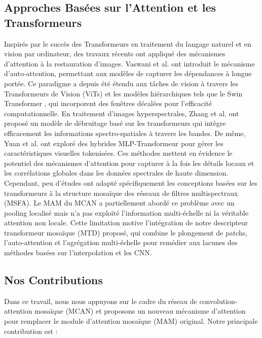 \documentclass[conference]{IEEEtran}
\begin{document}
\subsection{Approches Basées sur l'Attention et les Transformeurs}

Inspirés par le succès des Transformeurs en traitement du langage naturel et en vision par ordinateur, des travaux récents ont appliqué des mécanismes d'attention à la restauration d'images. Vaswani et al. \cite{Vaswani2023} ont introduit le mécanisme d'auto-attention, permettant aux modèles de capturer les dépendances à longue portée. Ce paradigme a depuis été étendu aux tâches de vision à travers les Transformeurs de Vision (ViTs) et les modèles hiérarchiques tels que le Swin Transformer \cite{Liu2021}, qui incorporent des fenêtres décalées pour l'efficacité computationnelle.
En traitement d'images hyperspectrales, Zhang et al. \cite{Fu2024} ont proposé un modèle de débruitage basé sur les transformeurs qui intègre efficacement les informations spectro-spatiales à travers les bandes. De même, Yuan et al. \cite{Wang2023} ont exploré des hybrides MLP-Transformeur pour gérer les caractéristiques visuelles tokenisées. Ces méthodes mettent en évidence le potentiel des mécanismes d'attention pour capturer à la fois les détails locaux et les corrélations globales dans les données spectrales de haute dimension.
Cependant, peu d'études ont adapté spécifiquement les conceptions basées sur les transformeurs à la structure mosaïque des réseaux de filtres multispectraux (MSFA). Le MAM du MCAN \cite{Feng2021} a partiellement abordé ce problème avec un pooling localisé mais n'a pas exploité l'information multi-échelle ni la véritable attention non locale. Cette limitation motive l'intégration de notre descripteur transformeur mosaïque (MTD) proposé, qui combine le plongement de patchs, l'auto-attention et l'agrégation multi-échelle pour remédier aux lacunes des méthodes basées sur l'interpolation et les CNN.\\

\subsection{Nos Contributions}

Dans ce travail, nous nous appuyons sur le cadre du réseau de convolution-attention mosaïque (MCAN) \cite{Feng2021} et proposons un nouveau mécanisme d'attention pour remplacer le module d'attention mosaïque (MAM) original. Notre principale contribution est :
\end{document}
